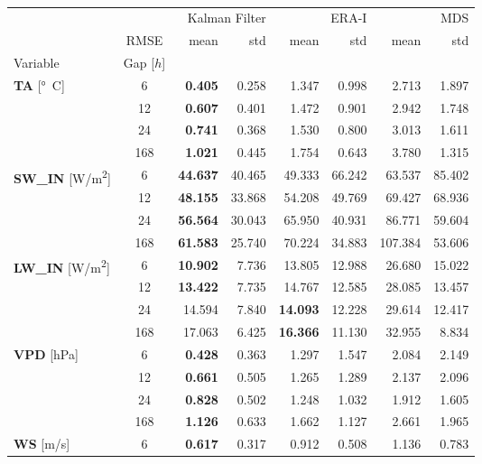 \begin{table}
\centering
\caption{\CapTheTable}
\label{tbl:the_table}
\begin{tabular}{p{2.1cm}c|rr|rr|rr}
\toprule
 &  & \multicolumn{2}{r}{Kalman Filter} & \multicolumn{2}{r}{ERA-I} & \multicolumn{2}{r}{MDS} \\
 & RMSE & mean & std & mean & std & mean & std \\
Variable & Gap [$h$] &  &  &  &  &  &  \\
\midrule
\multirow[c]{4}{*}{{\textbf{TA} [\si{°C}]}} & 6 & \bfseries 0.405 & 0.258 & 1.347 & 0.998 & 2.713 & 1.897 \\
 & 12 & \bfseries 0.607 & 0.401 & 1.472 & 0.901 & 2.942 & 1.748 \\
 & 24 & \bfseries 0.741 & 0.368 & 1.530 & 0.800 & 3.013 & 1.611 \\
 & 168 & \bfseries 1.021 & 0.445 & 1.754 & 0.643 & 3.780 & 1.315 \\
\cline{1-8}
\multirow[c]{4}{*}{{\textbf{SW\_IN} [\si{W/m^2}]}} & 6 & \bfseries 44.637 & 40.465 & 49.333 & 66.242 & 63.537 & 85.402 \\
 & 12 & \bfseries 48.155 & 33.868 & 54.208 & 49.769 & 69.427 & 68.936 \\
 & 24 & \bfseries 56.564 & 30.043 & 65.950 & 40.931 & 86.771 & 59.604 \\
 & 168 & \bfseries 61.583 & 25.740 & 70.224 & 34.883 & 107.384 & 53.606 \\
\cline{1-8}
\multirow[c]{4}{*}{{\textbf{LW\_IN} [\si{W/m^2}]}} & 6 & \bfseries 10.902 & 7.736 & 13.805 & 12.988 & 26.680 & 15.022 \\
 & 12 & \bfseries 13.422 & 7.735 & 14.767 & 12.585 & 28.085 & 13.457 \\
 & 24 & 14.594 & 7.840 & \bfseries 14.093 & 12.228 & 29.614 & 12.417 \\
 & 168 & 17.063 & 6.425 & \bfseries 16.366 & 11.130 & 32.955 & 8.834 \\
\cline{1-8}
\multirow[c]{4}{*}{{\textbf{VPD} [\si{hPa}]}} & 6 & \bfseries 0.428 & 0.363 & 1.297 & 1.547 & 2.084 & 2.149 \\
 & 12 & \bfseries 0.661 & 0.505 & 1.265 & 1.289 & 2.137 & 2.096 \\
 & 24 & \bfseries 0.828 & 0.502 & 1.248 & 1.032 & 1.912 & 1.605 \\
 & 168 & \bfseries 1.126 & 0.633 & 1.662 & 1.127 & 2.661 & 1.965 \\
\cline{1-8}
\multirow[c]{4}{*}{{\textbf{WS} [\si{m/s}]}} & 6 & \bfseries 0.617 & 0.317 & 0.912 & 0.508 & 1.136 & 0.783 \\

\end{tabular}
\end{table}
